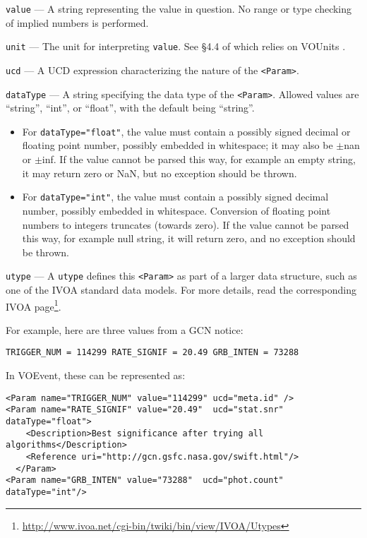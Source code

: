 \documentclass[11pt,a4paper]{ivoa}
\begin{document}
 {\tt value}\label{sec:3.3.1.2} --- A string representing
the value in question. No range or type checking of implied numbers is
performed.

 {\tt unit}\label{sec:3.3.1.3} --- The unit for
interpreting {\tt value}. See \S4.4 of \citet{2019ivoa.spec.1021O}
which relies on VOUnits \citep{2023ivoa.spec.1215G}.

 {\tt ucd}\label{sec:3.3.1.4} --- A UCD
\citep{2018ivoa.spec.0527P}
expression characterizing the nature of the {\tt <Param>}.

 {\tt dataType}\label{sec:3.3.1.5} --- A string specifying
the data type of the {\tt <Param>}. Allowed values are ``string'', ``int'', or
``float'', with the default being ``string''.
\begin{itemize}
\item For \verb|dataType="float"|, the value must contain a possibly signed decimal
or floating point number, possibly embedded in whitespace; it may also be
$\pm$nan or $\pm$inf. If the value cannot be parsed this way, for example an empty
string, it may return zero or NaN, but no exception should be thrown.
\item For \verb|dataType="int"|, the value must contain a possibly signed decimal
number, possibly embedded in whitespace. Conversion of floating point numbers to
integers truncates (towards zero). If the value cannot be parsed this way, for
example null string, it will return zero, and no exception should be thrown.
\end{itemize}

 {\tt utype}\label{sec:3.3.1.6} --- A {\tt utype} defines
this {\tt <Param>} as part of a larger data structure, such as one of the IVOA
standard data models. For more details, read the corresponding IVOA
page\footnote{\url{http://www.ivoa.net/cgi-bin/twiki/bin/view/IVOA/Utypes}}.

For example, here are three values from a GCN \citep{bib04} notice:
\begin{lstlisting}
TRIGGER_NUM = 114299 RATE_SIGNIF = 20.49 GRB_INTEN = 73288
\end{lstlisting}

In VOEvent, these can be represented as:
\begin{lstlisting}
<Param name="TRIGGER_NUM" value="114299" ucd="meta.id" />
<Param name="RATE_SIGNIF" value="20.49"  ucd="stat.snr" dataType="float">
    <Description>Best significance after trying all algorithms</Description>
    <Reference uri="http://gcn.gsfc.nasa.gov/swift.html"/>
  </Param>
<Param name="GRB_INTEN" value="73288"  ucd="phot.count" dataType="int"/>
\end{lstlisting}
\end{document}
